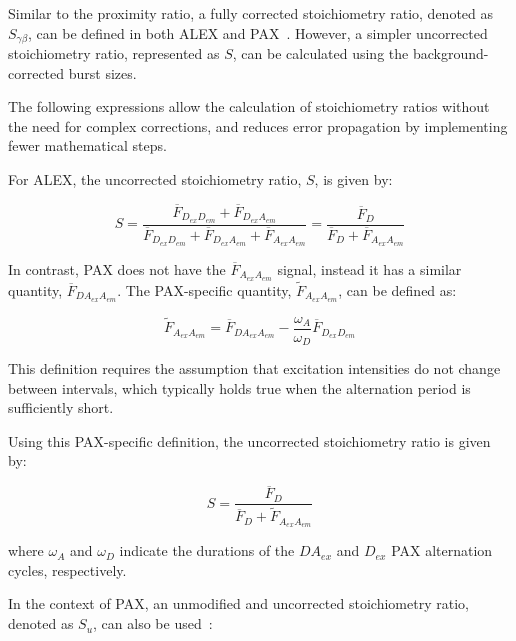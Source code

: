 Similar to the proximity ratio, a fully corrected stoichiometry ratio, denoted as $S_{\gamma\beta}$, can be defined in both \ac{ALEX} and \ac{PAX}~\cite{lee_BPJ_2005,ingargiola_JCP_2018}. 
However, a simpler uncorrected stoichiometry ratio, represented as $S$, can be calculated using the background-corrected burst sizes.

The following expressions allow the calculation of stoichiometry ratios without the need for complex corrections, and reduces error propagation by implementing fewer mathematical steps. 

For \ac{ALEX}, the uncorrected stoichiometry ratio, $S$, is given by:

\begin{equation}
\label{eqn:Salex}
S=\frac{\overline{F}_{D_{ex}D_{em}} + \overline{F}_{D_{ex}A_{em}}}{\overline{F}_{D_{ex}D_{em}} + \overline{F}_{D_{ex}A_{em}}+\overline{F}_{A_{ex}A_{em}}}=\frac{\overline{F}_D}{\overline{F}_D + \overline{F}_{A_{ex}A_{em}}}
\end{equation}

In contrast, \ac{PAX} does not have the $\overline{F}_{A_{ex}A_{em}}$ signal, instead it has a similar quantity, $\overline{F}_{DA_{ex}A_{em}}$.
The \ac{PAX}-specific quantity, $\tilde{F}_{A_{ex}A_{em}}$, can be defined as\cite{ingargiola_JCP_2018}:

\begin{equation}
    \label{eqn:Faa_pax}
    \tilde{F}_{A_{ex}A_{em}} = \overline{F}_{DA_{ex}A_{em}} - \frac{\omega_A}{\omega_D}\overline{F}_{D_{ex}D_{em}}
\end{equation}

\noindent
This definition requires the assumption that excitation intensities do not change between intervals, which typically holds true when the alternation period is sufficiently short.

Using this \ac{PAX}-specific definition, the uncorrected stoichiometry ratio is given by:

\begin{equation}
\label{eqn:Spax}
S = \frac{\overline{F}_D}{\overline{F}_D + \tilde{F}_{A_{ex}A_{em}}}
\end{equation}

\noindent
where $\omega_A$ and $\omega_D$ indicate the durations of the $DA_{ex}$ and $D_{ex}$ \ac{PAX} alternation cycles, respectively.

In the context of \ac{PAX}, an unmodified and uncorrected stoichiometry ratio, denoted as $S_u$, can also be used~\cite{ingargiola_JCP_2018}:

